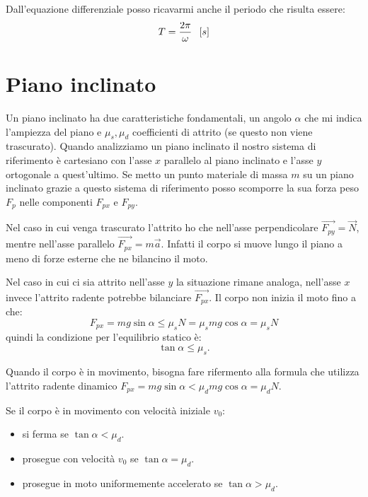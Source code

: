 \documentclass[class=book, crop=false, oneside, 12pt]{standalone}
\begin{document}
Dall'equazione differenziale posso ricavarmi anche il periodo che risulta essere:
\begin{equation*}
    T = \frac{2 \pi}{\omega} \hspace{0.2cm} \left[s\right]
\end{equation*}

\section{Piano inclinato}

Un piano inclinato ha due caratteristiche fondamentali, un angolo \(\alpha\) che mi indica l'ampiezza del piano e \(\mu_s, \mu_d\) coefficienti di attrito (se questo non viene trascurato).
Quando analizziamo un piano inclinato il nostro sistema di riferimento è cartesiano con l'asse \(x\) parallelo al piano inclinato e l'asse \(y\) ortogonale a quest'ultimo.
Se metto un punto materiale di massa \(m\) su un piano inclinato grazie a questo sistema di riferimento posso scomporre la sua forza peso \(F_p\) nelle componenti \(F_{px}\) e \(F_{py}\).

Nel caso in cui venga trascurato l'attrito ho che nell'asse perpendicolare \(\overrightarrow{F_{py}} = \overrightarrow{N}\),
mentre nell'asse parallelo \(\overrightarrow{F_{px}} = m \overrightarrow{a}\).
Infatti il corpo si muove lungo il piano a meno di forze esterne che ne bilancino il moto.

Nel caso in cui ci sia attrito nell'asse \(y\) la situazione rimane analoga, nell'asse \(x\) invece l'attrito radente potrebbe bilanciare \(\overrightarrow{F_{px}}\).
Il corpo non inizia il moto fino a che:
\begin{equation*}
    F_{px} = m g \sin \alpha \leq \mu_s N = \mu_s m g \cos \alpha = \mu_s N
\end{equation*}
quindi la condizione per l'equilibrio statico è:
\begin{equation}
    \tan \alpha \leq \mu_s.
\end{equation}

Quando il corpo è in movimento, bisogna fare rifermento alla formula che utilizza l'attrito radente dinamico \(F_{px} = m g \sin \alpha < \mu_d m g \cos \alpha = \mu_d N\).

Se il corpo è in movimento con velocità iniziale \(v_0\):
\begin{itemize}
    \item si ferma se \(\tan \alpha < \mu_d\).
    \item prosegue con velocità \(v_0\) se \(\tan \alpha  = \mu_d\).
    \item prosegue in moto uniformemente accelerato se \(\tan \alpha > \mu_d\).
\end{itemize}
\end{document}
